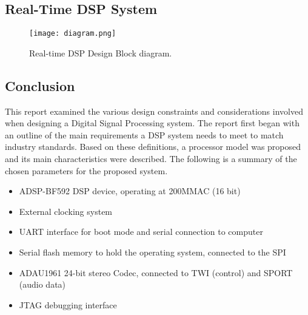 \subsection{Real-Time DSP System}

\begin{figure}[h!]
	\centering
	\texttt{[image: diagram.png]}
	\caption{Real-time DSP Design Block diagram.}
	\label{fig:block}
\end{figure}



\subsection{Conclusion}
This report examined the various design constraints and considerations involved when designing a Digital Signal Processing system. The report first began with an outline of the main requirements a DSP system needs to meet to match industry standards. Based on these definitions, a processor model was proposed and its main characteristics were described. The following is a summary of the chosen parameters for the proposed system. 


\begin{itemize}
	\setlength\itemsep{0.1em}
	\item ADSP-BF592 DSP device, operating at 200MMAC (16 bit)
	\item External clocking system 
	\item UART interface for boot mode and serial connection to computer 
	\item Serial flash memory to hold the operating system, connected to the SPI 
	\item ADAU1961 24-bit stereo Codec, connected to TWI (control) and SPORT (audio data)
	\item JTAG debugging interface
\end{itemize}
